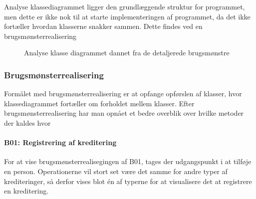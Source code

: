 Analyse klassediagrammet ligger den grundlæggende struktur for programmet, men dette er ikke nok til at starte implementeringen af programmet, da det ikke fortæller hvordan klasserne snakker sammen. Dette findes ved en brugsmønsterrealisering

\begin{figure}[H]
    \caption{Analyse klasse diagrammet dannet fra de detaljerede brugsmønstre}
    \label{fig:AnalyseKlasseDiagram}
\end{figure}

\subsubsection{Brugsmønsterrealisering} Formålet med brugsmønsterrealisering er at opfange opførslen af klasser, hvor klassediagrammet fortæller om forholdet mellem klasser. Efter brugsmønsterrealisering har man opnået et bedre overblik over hvilke metoder der kaldes hvor

\paragraph{B01: Registrering af kreditering} For at vise brugsmønsterrealisegingen af B01, tages der udgangspunkt i at tilføje en person. Operationerne vil stort set være det samme for andre typer af krediteringer, så derfor vises blot én af typerne for at visualisere det at registrere en kreditering.

